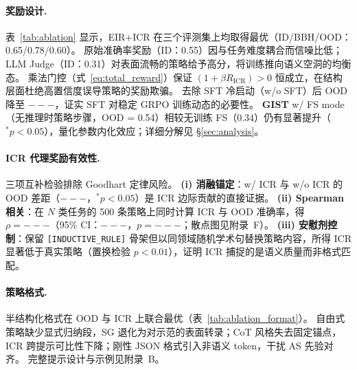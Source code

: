 \documentclass[11pt]{article}
\newcommand{\gist}{\textbf{GIST}}
\newcommand{\sg}{\textnormal{\textsc{SG}}}
\newcommand{\as}{\textnormal{\textsc{AS}}}
\newcommand{\cdash}{---}                %
\begin{document}
\paragraph{奖励设计.}
表~\ref{tab:ablation} 显示，EIR+ICR 在三个评测集上均取得最优（ID/BBH/OOD：0.65/0.78/0.60）。
原始准确率奖励（ID：0.55）因与任务难度耦合而信噪比低；LLM Judge（ID：0.31）对表面流畅的策略给予高分，将训练推向语义空洞的均衡态。
乘法门控（式~\eqref{eq:total_reward}）保证 $(1{+}\beta R_{\text{ICR}}){>}0$ 恒成立，在结构层面杜绝高置信度误导策略的奖励欺骗。
去除 SFT 冷启动（w/o SFT）后 OOD 降至 ${\cdash}$，证实 SFT 对稳定 GRPO 训练动态的必要性。
\gist{} w/ FS mode（无推理时策略步骤，OOD = 0.54）相较无训练 FS（0.34）仍有显著提升（$^{*}p{<}0.05$），量化参数内化效应；详细分解见 \S\ref{sec:analysis}。

\paragraph{ICR 代理奖励有效性.}
三项互补检验排除 Goodhart 定律风险。
\textbf{(i) 消融锚定}：w/ ICR 与 w/o ICR 的 OOD 差距（${\cdash}$，$^{*}p{<}0.05$）是 ICR 边际贡献的直接证据。
\textbf{(ii) Spearman 相关}：在 $N$ 类任务的 500 条策略上同时计算 ICR 与 OOD 准确率，得 $\rho{=}{\cdash}$（95\% CI：${\cdash}$，$p{=}{\cdash}$；散点图见附录~F）。
\textbf{(iii) 安慰剂控制}：保留 \texttt{[INDUCTIVE\_RULE]} 骨架但以同领域随机学术句替换策略内容，所得 ICR 显著低于真实策略（置换检验 $p{<}0.01$），证明 ICR 捕捉的是语义质量而非格式匹配。

\paragraph{策略格式.}
半结构化格式在 OOD 与 ICR 上联合最优（表~\ref{tab:ablation_format}）。
自由式策略缺少显式归纳段，\sg{} 退化为对示范的表面转录；CoT 风格失去固定锚点，ICR 跨提示可比性下降；刚性 JSON 格式引入非语义 token，干扰 \as{} 先验对齐。
完整提示设计与示例见附录~B。
\end{document}

